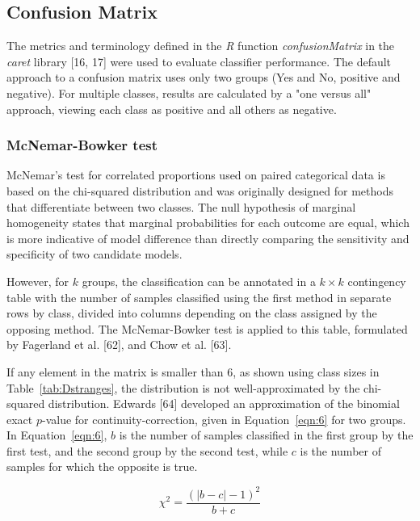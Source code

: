 \let\LaTeXcline\cline\documentclass[sn-mathphys-num]{sn-jnl}\let\cline\LaTeXcline
\begin{document}
\subsection{Confusion Matrix}

The metrics and terminology defined in the \textit{R} function \textit{confusionMatrix} in the \textit{caret} library [16, 17] were used to evaluate classifier performance. The default approach to a confusion matrix uses only two groups (Yes and No, positive and negative). For multiple classes, results are calculated by a "one versus all" approach, viewing each class as positive and all others as negative.

\subsubsection{McNemar-Bowker test}

McNemar’s test for correlated proportions used on paired categorical data is based on the chi-squared distribution and was originally designed for methods that differentiate between two classes. The null hypothesis of marginal homogeneity states that marginal probabilities for each outcome are equal, which is more indicative of model difference than directly comparing the sensitivity and specificity of two candidate models.

However, for $k$ groups, the classification can be annotated
in a $k \times k$ contingency table with the number of samples classified using the first method in separate rows by class, divided into columns depending on the class assigned by the opposing method. The McNemar-Bowker test is applied to this table, formulated by Fagerland et al. [62], and Chow et al. [63].

If any element in the matrix is smaller than $6$, as shown using class sizes in Table~\ref{tab:Dstranges}, the distribution is not well-approximated by the chi-squared distribution. Edwards [64] developed an approximation of the binomial exact $p$-value for continuity-correction, given in Equation~\ref{eqn:6} for two groups. In Equation~\ref{eqn:6}, $b$ is the number of samples classified in the first group by the first test, and the second group by the second test, while $c$ is the number of samples for which the opposite is true.
 
\begin{equation}
    \chi^{2}=\frac{(|b-c|-1)^{2}}{b+c}
    \label{eqn:6}
\end{equation}
\end{document}
